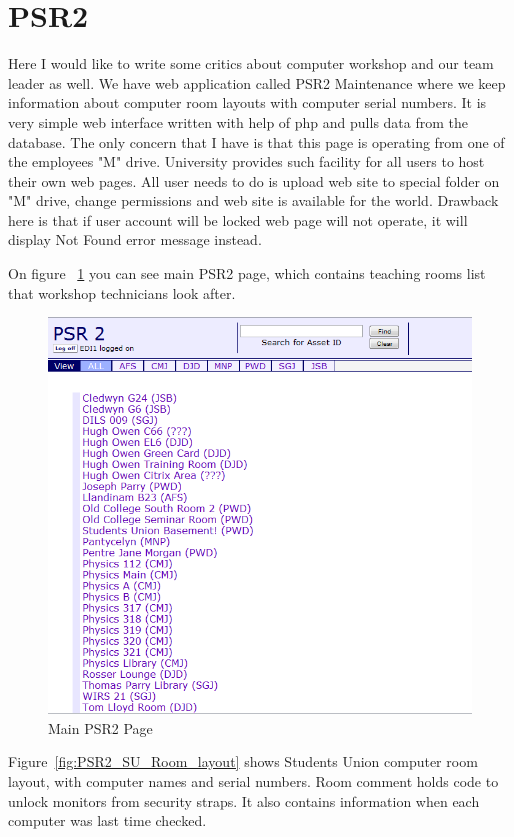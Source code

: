 \documentclass[10pt,a4paper,headinclude=true]{report}
\begin{document}
\section{PSR2}
Here I would like to write some critics about computer workshop and our team leader as well. We have web application called PSR2 Maintenance where we keep information about computer room layouts with computer serial numbers. It is very simple web interface written with help of php and pulls data from the database. The only concern that I have is that this page is operating from one of the employees "M" drive. University provides such facility for all users to host their own web pages. All user needs to do is upload web site to special folder on "M" drive, change permissions and web site is available for the world. Drawback here is that if user account will be locked web page will not operate, it will display Not Found error message instead. 

On figure ~\ref{fig:main_PSR2_page} you can see main PSR2 page, which contains teaching rooms list that workshop technicians look after.

\begin{figure}[H]
\centering
\centerline{\includegraphics[scale=0.3]{./PSR2}}
\caption{Main PSR2 Page}
\label{fig:main_PSR2_page}
\end{figure}

Figure~\ref{fig:PSR2_SU_Room_layout} shows Students Union computer room layout, with computer names and serial numbers. Room comment holds code to unlock monitors from security straps. It also contains information when each computer was last time checked.
\end{document}
